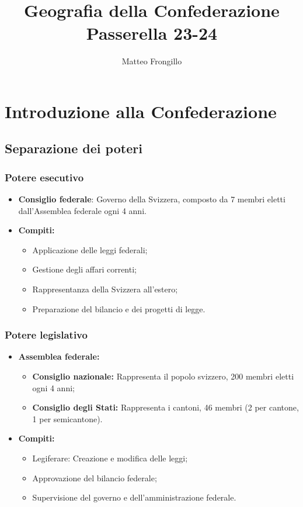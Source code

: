 \documentclass{article}
\title{\textbf{Geografia della Confederazione\\Passerella 23-24}}
\author{Matteo Frongillo}
\begin{document}
\maketitle
\tableofcontents

\newpage
\section{Introduzione alla Confederazione}

\subsection{Separazione dei poteri}

\subsubsection{Potere esecutivo}
\begin{itemize}
    \item \textbf{Consiglio federale}: Governo della Svizzera, composto da 7 membri eletti
        dall'Assemblea federale ogni 4 anni.
    \item \textbf{Compiti:}
    \begin{itemize}
        \item Applicazione delle leggi federali;
        \item Gestione degli affari correnti;
        \item Rappresentanza della Svizzera all'estero;
        \item Preparazione del bilancio e dei progetti di legge.
    \end{itemize}
\end{itemize}

\subsubsection{Potere legislativo}
\begin{itemize}
    \item \textbf{Assemblea federale:}
    \begin{itemize}
        \item \textbf{Consiglio nazionale:} Rappresenta il popolo svizzero, 200 membri eletti
            ogni 4 anni;
        \item \textbf{Consiglio degli Stati:} Rappresenta i cantoni, 46 membri (2 per cantone,
            1 per semicantone).
    \end{itemize}
    \item \textbf{Compiti:}
        \begin{itemize}
            \item Legiferare: Creazione e modifica delle leggi;
            \item Approvazione del bilancio federale;
            \item Supervisione del governo e dell'amministrazione federale.
        \end{itemize}
\end{itemize}
\end{document}
